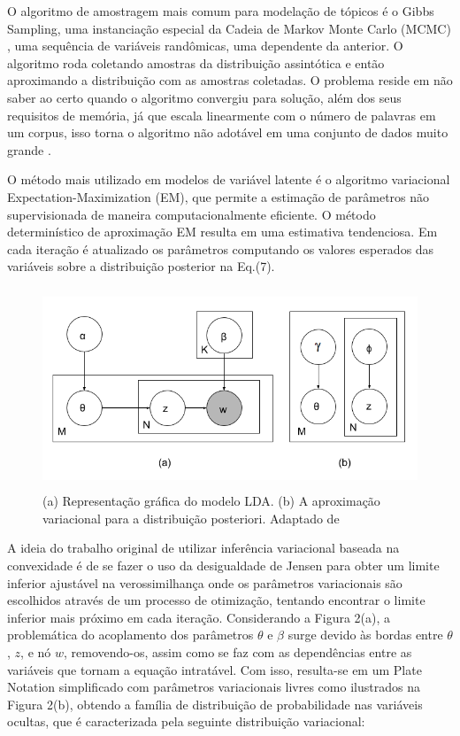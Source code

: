 \documentclass[12pt,a4paper]{article}
\begin{document}
O algoritmo de amostragem mais comum para modelação de tópicos é o Gibbs Sampling, uma instanciação especial da Cadeia de Markov Monte Carlo (MCMC) \cite{jordan1999introduction},
 uma sequência de variáveis randômicas, uma dependente da anterior. O algoritmo roda coletando amostras da distribuição assintótica e então aproximando a distribuição com as amostras coletadas.
 O problema reside em não saber ao certo  quando o algoritmo convergiu para solução, além dos seus requisitos de memória, já que escala linearmente com o número de palavras em um corpus,
 isso torna o algoritmo não adotável em uma conjunto de dados muito grande \cite{vrehuuvrek2011scalability}.

O método mais utilizado em modelos de variável latente é o algoritmo variacional Expectation-Maximization (EM), que permite a estimação de parâmetros não supervisionada de maneira computacionalmente eficiente. O método determinístico de aproximação EM resulta em uma estimativa tendenciosa. Em cada iteração é atualizado os parâmetros computando os valores esperados das variáveis sobre a distribuição posterior na Eq.(7).


\begin{figure}[H]
	\centering
    \includegraphics[height=6cm]{images/figure_2.png}
    \caption{(a) Representação gráfica do modelo LDA. (b) A aproximação variacional para a distribuição posteriori. Adaptado de }
\end{figure}

A ideia do trabalho original de utilizar inferência variacional baseada na convexidade é de se fazer o uso da desigualdade de Jensen para obter um limite inferior ajustável na verossimilhança \cite{jordan1999introduction} onde os parâmetros variacionais são escolhidos através de um processo de otimização,
 tentando encontrar o limite inferior mais próximo em cada iteração. Considerando a Figura 2(a), a problemática do acoplamento dos parâmetros $\theta$ e $\beta$ surge devido às bordas entre $\theta$, $z$,
 e nó $w$, removendo-os, assim como se faz com as dependências entre as variáveis que tornam a equação intratável. Com isso,
 resulta-se em um Plate Notation simplificado com parâmetros variacionais livres como ilustrados na Figura 2(b), obtendo a família de distribuição de probabilidade nas variáveis ocultas,
 que é caracterizada pela seguinte distribuição variacional:
\end{document}
